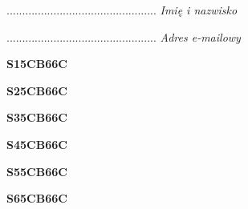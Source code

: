 \begin{turn}{90}\begin{minipage}{\linewidth} \vspace{20mm} ................................................  \textit{Imię i nazwisko}\end{minipage}\end{turn}

\begin{turn}{90}\begin{minipage}{\linewidth} \vspace{20mm} ................................................  \textit{Adres e-mailowy}\end{minipage}\end{turn}

\begin{turn}{90}\huge \begin{minipage}{\linewidth} \vspace{10mm}\textbf{S15CB66C}\end{minipage}\end{turn}

\begin{turn}{90}\huge \begin{minipage}{\linewidth} \vspace{10mm}\textbf{S25CB66C}\end{minipage}\end{turn}

\begin{turn}{90}\huge \begin{minipage}{\linewidth} \vspace{10mm}\textbf{S35CB66C}\end{minipage}\end{turn}

\begin{turn}{90}\huge \begin{minipage}{\linewidth} \vspace{10mm}\textbf{S45CB66C}\end{minipage}\end{turn}

\begin{turn}{90}\huge \begin{minipage}{\linewidth} \vspace{10mm}\textbf{S55CB66C}\end{minipage}\end{turn}

\begin{turn}{90}\huge \begin{minipage}{\linewidth} \vspace{10mm}\textbf{S65CB66C}\end{minipage}\end{turn}

